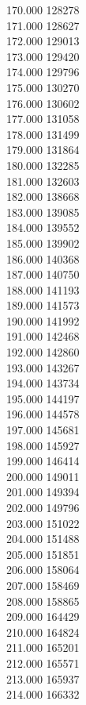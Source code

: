 { 170.000	128278 \\
 171.000	128627 \\
 172.000	129013 \\
 173.000	129420 \\
 174.000	129796 \\
 175.000	130270 \\
 176.000	130602 \\
 177.000	131058 \\
 178.000	131499 \\
 179.000	131864 \\
 180.000	132285 \\
 181.000	132603 \\
 182.000	138668 \\
 183.000	139085 \\
 184.000	139552 \\
 185.000	139902 \\
 186.000	140368 \\
 187.000	140750 \\
 188.000	141193 \\
 189.000	141573 \\
 190.000	141992 \\
 191.000	142468 \\
 192.000	142860 \\
 193.000	143267 \\
 194.000	143734 \\
 195.000	144197 \\
 196.000	144578 \\
 197.000	145681 \\
 198.000	145927 \\
 199.000	146414 \\
 200.000	149011 \\
 201.000	149394 \\
 202.000	149796 \\
 203.000	151022 \\
 204.000	151488 \\
 205.000	151851 \\
 206.000	158064 \\
 207.000	158469 \\
 208.000	158865 \\
 209.000	164429 \\
 210.000	164824 \\
 211.000	165201 \\
 212.000	165571 \\
 213.000	165937 \\
 214.000	166332 \\
}
